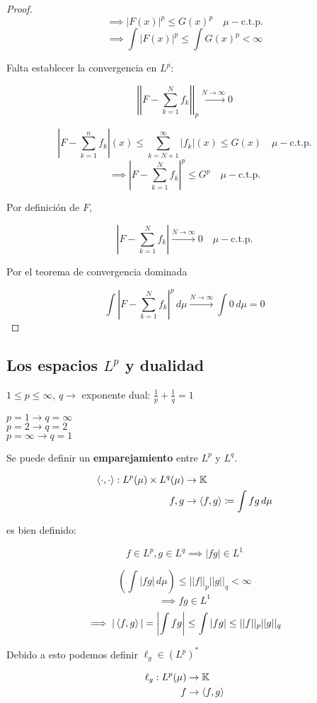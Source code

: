 \begin{proof}
    \[\implies |F(x)|^p\leq G(x)^p\quad \mu-\text{c.t.p.}\]
    \[\implies \int |F(x)|^p\leq \int G(x)^p<\infty\]

    Falta establecer la convergencia en $L^p$:

    \[\left|\left|F-\sum_{k=1}^N f_k\right|\right|_p\xrightarrow{N\to\infty}0\]

    \[\left|F-\sum_{k=1}^n f_k\right|(x)\leq \sum_{k=N+1}^\infty |f_k|(x)\leq G(x)\quad\mu-\text{c.t.p.}\]
    \[\implies \left|F-\sum_{k=1}^N f_k\right|^p\leq G^p\quad \mu-\text{c.t.p.}\]

    Por definición de $F$, 
    
    \[|F-\sum_{k=1}^N f_k|\xrightarrow{N\to\infty}0\quad\mu-\text{c.t.p.}\]
    
    Por el teorema de convergencia dominada 

    \[\int \left|F-\sum_{k=1}^N f_k\right|^p\,d\mu\xrightarrow{N\to\infty}\int 0\,d\mu=0\]

\end{proof}

\subsection{Los espacios $L^p$ y dualidad}

$1\leq p\leq\infty$, $q\rightarrow$ exponente dual: $\frac{1}{p}+\frac{1}{q}=1$
    
$p=1\to q=\infty$\\
$p=2\to q=2$\\
$p=\infty\to q=1$

Se puede definir un \textbf{emparejamiento} entre $L^p$ y $L^q$.

\begin{align*}
    \left\langle \cdot,\cdot\right\rangle:L^p(\mu)\times L^q(\mu)&\to\mathbb{K}\\
    f,g&\to \left\langle f,g\right\rangle\coloneqq \int fg\,d\mu
\end{align*}

es bien definido:

\[f\in L^p,g\in L^q\implies |fg|\in L^1\]

\[\left(\int |fg|\,d\mu\right)\leq ||f||_p||g||_q<\infty\]
\[\implies fg\in L^1\]
\[\implies |\left\langle f,g\right\rangle|=\left|\int fg\right|\leq \int |fg|\leq ||f||_p||g||_q\]

Debido a esto podemos definir $\ell_g\in (L^p)^*$

\begin{align*}
   \ell_g:L^p(\mu)&\to\mathbb{K}\\
   f&\to \left\langle f,g\right\rangle
\end{align*}

